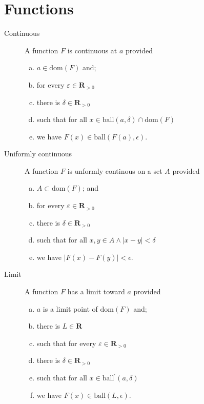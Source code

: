 \documentclass[letterpaper,landscape,9pt,fleqn]{extarticle}
\newcommand{\dom}{\mathrm{dom}}
\newcommand{\reals}{\mathbf{R}}
\newcommand{\ball}{\mathrm{ball}}
\newenvironment{alphalist}{
  \begin{enumerate}[(a)]
    \addtolength{\itemsep}{-1.0\itemsep}}
  {\end{enumerate}}
\begin{document}
\begin{multicols*}{3}
\begin{description}[\itemsep=1.5pt \parsep=1.5pt]
\end{description}    
\section*{Functions}   
\begin{description}
    \item[Continuous] A function $F$ is continuous at $a$ provided
    \begin{alphalist}
        \item $a \in \dom(F)$ and; 
        \item for every $\varepsilon \in \reals_{>0}$
        \item there is $\delta \in \reals_{>0}$
        \item such that for all $x \in \ball(a,\delta) \cap \dom(F)$
        \item we have $F(x) \in \ball(F(a), \epsilon)$.
    \end{alphalist}

    \item[Uniformly continuous]  A function $F$ is unformly continous on a set $A$ provided 
       \begin{alphalist}
          \item $A \subset \dom(F)$; and
          \item for every $\varepsilon \in \reals_{>0}$
          \item there is $\delta \in \reals_{>0}$
          \item such that for all $x,y  \in A \land |x-y| < \delta$
          \item we have $|F(x) - F(y)| < \epsilon$.
       \end{alphalist} 
    \item[Limit]  A function $F$ has a limit toward $a$ provided
       \begin{alphalist}
          \item $a$ is a limit point of $\dom(F)$ and;
          \item there is $L \in \reals$
          \item such that for every $\varepsilon \in \reals_{>0}$
          \item there is $\delta \in \reals_{>0}$
          \item such that for all $x \in \ball^\prime(a,\delta)$
          \item we have $F(x) \in \ball(L, \epsilon)$.
       \end{alphalist} 


\end{description}
\end{multicols*}
\end{document}
